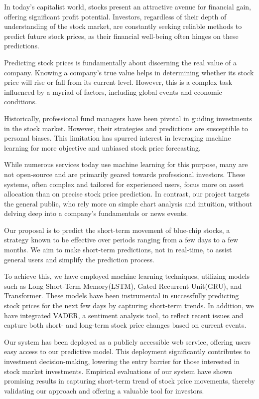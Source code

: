 In today's capitalist world, stocks present an attractive avenue for financial gain, offering significant profit potential. 
Investors, regardless of their depth of understanding of the stock market, are constantly seeking reliable methods to predict future stock prices, as their financial well-being often hinges on these predictions.

Predicting stock prices is fundamentally about discerning the real value of a company. 
Knowing a company's true value helps in determining whether its stock price will rise or fall from its current level. 
However, this is a complex task influenced by a myriad of factors, including global events and economic conditions.

Historically, professional fund managers have been pivotal in guiding investments in the stock market. 
However, their strategies and predictions are susceptible to personal biases. 
This limitation has spurred interest in leveraging machine learning for more objective and unbiased stock price forecasting.

While numerous services today use machine learning for this purpose, many are not open-source and are primarily geared towards professional investors. 
These systems, often complex and tailored for experienced users, focus more on asset allocation than on precise stock price prediction. 
In contrast, our project targets the general public, who rely more on simple chart analysis and intuition, without delving deep into a company's fundamentals or news events.

Our proposal is to predict the short-term movement of blue-chip stocks, a strategy known to be effective over periods ranging from a few days to a few months. 
We aim to make short-term predictions, not in real-time, to assist general users and simplify the prediction process.

To achieve this, we have employed machine learning techniques, utilizing models such as Long Short-Term Memory(LSTM), Gated Recurrent Unit(GRU), and Transformer. 
These models have been instrumental in successfully predicting stock prices for the next few days by capturing short-term trends. 
In addition, we have integrated VADER, a sentiment analysis tool, to reflect recent issues and capture both short- and long-term stock price changes based on current events.

Our system has been deployed as a publicly accessible web service, offering users easy access to our predictive model. 
This deployment significantly contributes to investment decision-making, lowering the entry barrier for those interested in stock market investments. 
Empirical evaluations of our system have shown promising results in capturing short-term trend of stock price movements, thereby validating our approach and offering a valuable tool for investors.